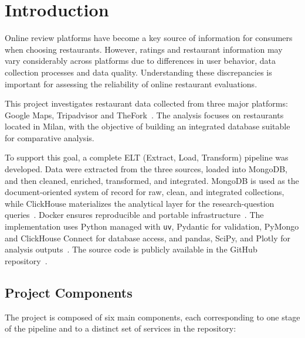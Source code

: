 \chapter{Introduction}

Online review platforms have become a key source of information for consumers when choosing restaurants. However, ratings and restaurant information may vary considerably across platforms due to differences in user behavior, data collection processes and data quality. Understanding these discrepancies is important for assessing the reliability of online restaurant evaluations.

This project investigates restaurant data collected from three major platforms: Google Maps, Tripadvisor and TheFork~\cite{google-places,tripadvisor,thefork}. The analysis focuses on restaurants located in Milan, with the objective of building an integrated database suitable for comparative analysis.

To support this goal, a complete ELT (Extract, Load, Transform) pipeline was developed. Data were extracted from the three sources, loaded into MongoDB, and then cleaned, enriched, transformed, and integrated. MongoDB is used as the document-oriented system of record for raw, clean, and integrated collections, while ClickHouse materializes the analytical layer for the research-question queries~\cite{mongodb,clickhouse}. Docker ensures reproducible and portable infrastructure~\cite{docker}. The implementation uses Python managed with \texttt{uv}, Pydantic for validation, PyMongo and ClickHouse Connect for database access, and pandas, SciPy, and Plotly for analysis outputs~\cite{python-uv,pydantic,database-drivers,analysis-stack}. The source code is publicly available in the GitHub repository~\cite{project-repo}.

\section{Project Components}

The project is composed of six main components, each corresponding to one stage of the pipeline and to a distinct set of services in the repository:

